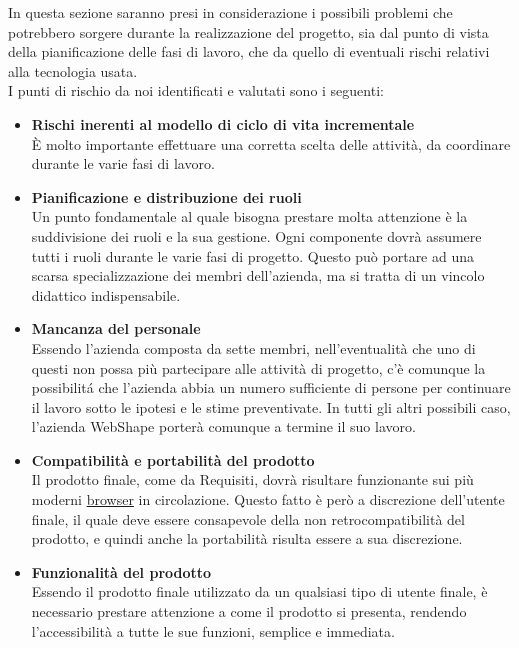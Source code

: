 In questa sezione saranno presi in considerazione i possibili problemi che potrebbero sorgere durante la realizzazione del progetto, sia dal punto di vista della pianificazione delle fasi di lavoro, che da quello di eventuali rischi relativi alla tecnologia usata.\\
I punti di rischio da noi identificati e valutati sono i seguenti:
\begin{itemize}
\item \textbf{Rischi inerenti al modello di ciclo di vita incrementale}\\
\`E molto importante effettuare una corretta scelta delle attivit\`a, da coordinare durante le varie fasi di lavoro.
\item \textbf{Pianificazione e distribuzione dei ruoli}\\
Un punto fondamentale al quale bisogna prestare molta attenzione \`e la suddivisione dei ruoli e la sua gestione. Ogni componente dovr\`a assumere tutti i ruoli durante le varie fasi di progetto. Questo pu\`o portare ad una scarsa specializzazione dei membri dell'azienda, ma si tratta di un vincolo didattico indispensabile.
\item \textbf{Mancanza del personale}\\
Essendo l'azienda composta da sette membri, nell'eventualit\`a che uno di questi non possa pi\`u partecipare alle attivit\`a di progetto, c'\`e comunque la possibilit\'a che l'azienda abbia un numero sufficiente di persone per continuare il lavoro sotto le ipotesi e le stime preventivate. In tutti gli altri possibili caso, l'azienda WebShape porter\`a comunque a termine il suo lavoro.
\item \textbf{Compatibilit\`a e portabilit\`a del prodotto}\\
Il prodotto finale, come da Requisiti, dovr\`a risultare funzionante sui pi\`u moderni {\underline{browser}} in circolazione. Questo fatto \`e per\`o  a discrezione dell'utente finale, il quale deve essere consapevole della non retrocompatibilit\`a del prodotto, e quindi anche la portabilit\`a risulta essere  a sua discrezione.
\item \textbf{Funzionalit\`a del prodotto}\\
Essendo il prodotto finale utilizzato da un qualsiasi tipo di utente finale, \`e necessario prestare attenzione a come il prodotto si presenta, rendendo l'accessibilit\`a a tutte le sue funzioni, semplice e immediata.
\end{itemize}			


